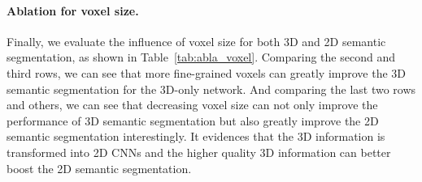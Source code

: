 \documentclass[final]{cvpr}
\begin{document}
\begin{table}[!t]
	\centering
	\renewcommand{\tabcolsep}{9pt}
	
	\vspace*{0.5mm}
	\caption{
		2D and 3D semantic segmentation results of different voxel sizes on the validation set of ScanNetV2.
	}
	\label{tab:abla_voxel}
	\vspace{-5mm}
\end{table}


\vspace{-4mm}
\paragraph{Ablation for voxel size.}

Finally, we evaluate the influence of voxel size for both 3D and 2D semantic segmentation, as shown in Table~\ref{tab:abla_voxel}.
Comparing the second and third rows, we can see that more fine-grained voxels can greatly improve the 3D semantic segmentation for the 3D-only network.
And comparing the last two rows and others, we can see that decreasing voxel size can not only improve the performance of 3D semantic segmentation but also greatly improve the 2D semantic segmentation interestingly.
It evidences that the 3D information is transformed into 2D CNNs and the higher quality 3D information can better boost the 2D semantic segmentation.




\vspace{-1.5mm}
\end{document}

